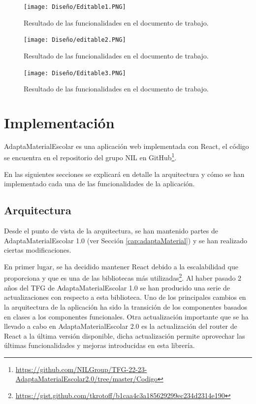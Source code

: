 \begin{figure}[ht!]
  \centering
  \texttt{[image: Diseño/Editable1.PNG]}
  \caption{Resultado de las funcionalidades en el documento de trabajo.}
  \label{editable1}
\end{figure}

\begin{figure}[ht!]
  \centering
  \texttt{[image: Diseño/editable2.PNG]}
  \caption{Resultado de las funcionalidades en el documento de trabajo.}
  \label{editable2}
\end{figure}

\begin{figure}[ht!]
  \centering
  \texttt{[image: Diseño/Editable3.PNG]}
  \caption{Resultado de las funcionalidades en el documento de trabajo.}
  \label{editable3}
\end{figure}

\section{Implementación}
AdaptaMaterialEscolar es una aplicación web implementada con React, el código se encuentra en el repositorio del grupo NIL en GitHub\footnote{\url{https://github.com/NILGroup/TFG-22-23-AdaptaMaterialEscolar2.0/tree/master/Codigo}}.

En las siguientes secciones se explicará en detalle la arquitectura y cómo se han implementado cada una de las funcionalidades de la aplicación.
\subsection{Arquitectura}
\label{sub:Arquitectura}
Desde el punto de vista de la arquitectura, se han mantenido partes de AdaptaMaterialEscolar 1.0 (ver Sección \ref{cap:adaptaMaterial}) y se han realizado ciertas modificaciones.

En primer lugar, se ha decidido mantener React debido a la escalabilidad que proporciona y que es una de las bibliotecas más utilizadas\footnote{\url{https://gist.github.com/tkrotoff/b1caa4c3a185629299ec234d2314e190}}. Al haber pasado 2 años del TFG de AdaptaMaterialEscolar 1.0 se han producido una serie de actualizaciones con respecto a esta biblioteca. Uno de los principales cambios en la arquitectura de la aplicación ha sido la transición de los componentes basados en clases a los componentes funcionales. Otra actualización importante que se ha llevado a cabo en AdaptaMaterialEscolar 2.0 es la actualización del router de React a la última versión disponible, dicha actualización  permite aprovechar las últimas funcionalidades y mejoras introducidas en esta librería.

